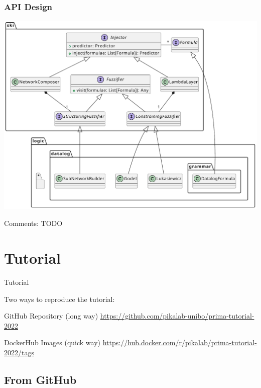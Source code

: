 \documentclass[presentation]{beamer}\mode<presentation>{\usetheme{AMSBolognaFC}}
\begin{document}
\begin{frame}[allowframebreaks]
\frametitle{API Design}

    \begin{center}
        \includegraphics[width=.7\linewidth]{figures/psyki-class-diagram.pdf}
    \end{center}

    \framebreak

    Comments: TODO
\end{frame}


\section{Tutorial}

\begin{frame}{Tutorial}

    Two ways to reproduce the tutorial:
    
    \begin{block}{GitHub Repository (long way)}\centering
        \alert{\url{https://github.com/pikalab-unibo/prima-tutorial-2022}}
    \end{block}

    \begin{block}{DockerHub Images (quick way)}\centering
        \alert{\url{https://hub.docker.com/r/pikalab/prima-tutorial-2022/tags}}
    \end{block}
\end{frame}

\subsection{From GitHub}
\end{document}
